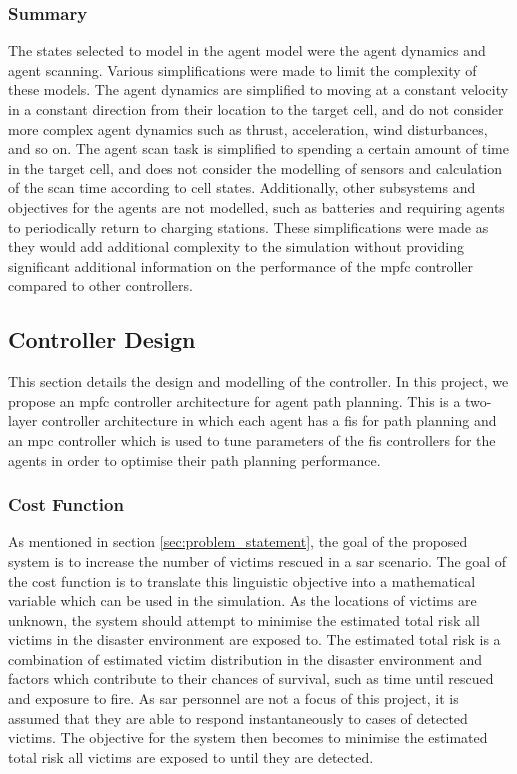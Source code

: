 \documentclass[conference]{IEEEtran}
\begin{document}
\subsubsection{Summary}
The states selected to model in the agent model were the agent dynamics and agent scanning.
Various simplifications were made to limit the complexity of these models.
The agent dynamics are simplified to moving at a constant velocity in a constant direction from their location to the target cell, and do not consider more complex agent dynamics such as thrust, acceleration, wind disturbances, and so on.
The agent scan task is simplified to spending a certain amount of time in the target cell, and does not consider the modelling of sensors and calculation of the scan time according to cell states.
Additionally, other subsystems and objectives for the agents are not modelled, such as batteries and requiring agents to periodically return to charging stations.
These simplifications were made as they would add additional complexity to the simulation without providing significant additional information on the performance of the \gls{mpfc} controller compared to other controllers.

\subsection{Controller Design} \label{subsec:controllerDesign}
This section details the design and modelling of the controller.
In this project, we propose an \gls{mpfc} controller architecture for agent path planning.
This is a two-layer controller architecture in which each agent has a \gls{fis} for path planning and an \gls{mpc} controller which is used to tune parameters of the \gls{fis} controllers for the agents in order to optimise their path planning performance.

\subsubsection{Cost Function} \label{subsec:costFunction}
As mentioned in section \ref{sec:problem_statement}, the goal of the proposed system is to increase the number of victims rescued in a \gls{sar} scenario.
The goal of the cost function is to translate this linguistic objective into a mathematical variable which can be used in the simulation.
As the locations of victims are unknown, the system should attempt to minimise the estimated total risk all victims in the disaster environment are exposed to.
The estimated total risk is a combination of estimated victim distribution in the disaster environment and factors which contribute to their chances of survival, such as time until rescued and exposure to fire.
As \gls{sar} personnel are not a focus of this project, it is assumed that they are able to respond instantaneously to cases of detected victims.
The objective for the system then becomes to minimise the estimated total risk all victims are exposed to until they are detected.
\end{document}
